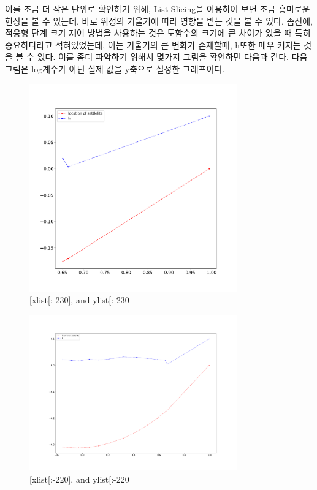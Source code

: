 \documentclass[11pt]{article}
\begin{document}
이를 조금 더 작은 단위로 확인하기 위해, List Slicing을 이용하여 보면 조금 흥미로운 현상을 볼 수 있는데, 바로 위성의 기울기에 따라 영향을 받는 것을 볼 수 있다. 좀전에, 적응형 단계 크기 제어 방법을 사용하는 것은 도함수의 크기에 큰 차이가 있을 때 특히 중요하다라고 적혀있었는데, 이는 기울기의 큰 변화가 존재할때, h또한 매우 커지는 것을 볼 수 있다. 이를 좀더 파악하기 위해서 몇가지 그림을 확인하면 다음과 같다. 다음 그림은 log계수가 아닌 실제 값을 y축으로 설정한 그래프이다.

\begin{figure}[!ht]
  \centering
  \includegraphics[width=0.8\textwidth]{xandhs2.pdf}
  \caption{[xlist[:-230], and ylist[:-230}
\end{figure} 
  
\begin{figure}[!ht]
  \centering
  \includegraphics[width=0.8\textwidth]{xandhs3.pdf}
  \caption{[xlist[:-220], and ylist[:-220}
\end{figure} 
\end{document}
